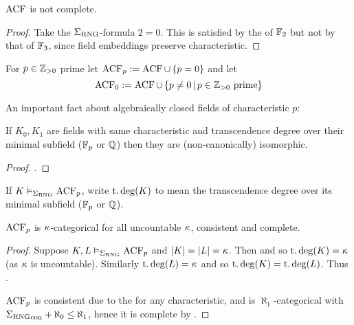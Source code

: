 \begin{prop}
    $\operatorname{ACF}$ is not complete.
\end{prop}
\begin{proof}
    Take the $\Sigma_{\mathrm{RNG}}$-formula $2 = 0$.
    This is satisfied by the 
    of $\mathbb{F}_2$ but not by that of $\mathbb{F}_3$,
    since field embeddings preserve characteristic. 
\end{proof}

\begin{dfn}
    For $p \in \mathbb{Z}_{>0}$ prime let $\operatorname{ACF}_p := \operatorname{ACF} \cup \left\{p = 0\right\}$
    and let
    \[\operatorname{ACF}_0 := \operatorname{ACF} \cup \left\{p \ne 0 \,|\, p \in \mathbb{Z}_{>0} \text{ prime}\right\}\]
\end{dfn}

An important fact about algebraically closed fields of characteristic $p$:
\begin{prop}
    If $K_0,K_1$ are fields with same characteristic and 
    transcendence degree over their minimal subfield ($\mathbb{F}_p$ or $\mathbb{Q}$)
    then they are (non-canonically) isomorphic.
\end{prop}
\begin{proof}
    .
\end{proof}

\begin{nttn}
    If $K \vDash_{\Sigma_{\mathrm{RNG}}} \operatorname{ACF}_p$, write $\operatorname{t.deg}(K)$ to mean the 
    transcendence degree over its minimal subfield ($\mathbb{F}_p$ or $\mathbb{Q}$).
\end{nttn}

\begin{prop}
    $\operatorname{ACF}_p$ is $\kappa$-categorical for all uncountable $\kappa$, consistent
    and complete.
\end{prop}
\begin{proof}
    Suppose $K,L \vDash_{\Sigma_{\mathrm{RNG}}} \operatorname{ACF}_p$ and $\left\vert K \right\vert = \left\vert L \right\vert = \kappa$.
    Then 
    and so $\operatorname{t.deg}(K) = \kappa$ (as $\kappa$ is uncountable).
    Similarly $\operatorname{t.deg}(L) = \kappa$ and so $\operatorname{t.deg}(K) = \operatorname{t.deg}(L)$.
    Thus .
    
    $\operatorname{ACF}_p$ is consistent due to the
    for any characteristic,
    and is $\aleph_1$-categorical with 
    ${\Sigma_{\mathrm{RNG}}}_\mathrm{con} + \aleph_0 \leq \aleph_1$,
    hence it is complete by .
\end{proof}

